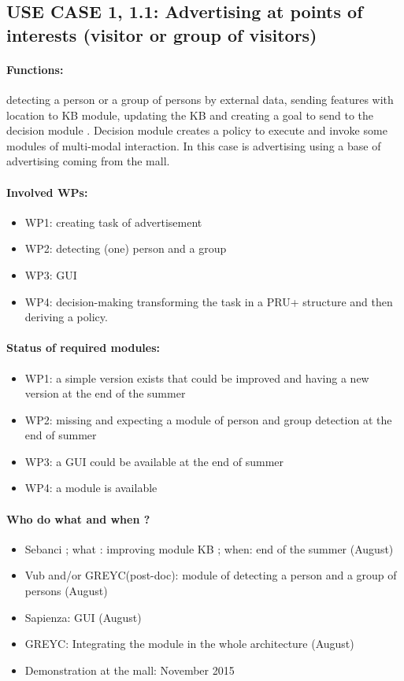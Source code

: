 \documentclass{article}
\begin{document}
\subsection{USE CASE 1, 1.1:  Advertising at points of interests (visitor or group of visitors)}
\paragraph{\bf Functions:} detecting a person or a group of persons by external data, sending features with location to KB module, updating the KB  and creating a goal to send to the decision module . Decision module creates a policy to execute and invoke some modules of  multi-modal interaction. In this case is advertising using a base of advertising coming from the mall. \\
\paragraph{Involved WPs:}
\begin{itemize}
\item WP1:  creating task of advertisement
\item WP2: detecting (one) person and a group 
\item WP3: GUI
\item WP4: decision-making transforming the task in a PRU+ structure and then deriving a policy. 
\end{itemize}
\paragraph{\bf Status of required modules:}
\begin{itemize}
\item WP1: a simple version exists that could be improved and having a new version at the end of the summer
\item WP2: missing and expecting a module of person and group detection at the end of summer
\item WP3: a GUI could be available at the end of summer
\item WP4: a module is available
\end{itemize}
\paragraph{Who do what and when ?}
\begin{itemize} 
\item Sebanci ; what : improving module KB ; when: end of the summer (August)
\item Vub and/or GREYC(post-doc): module of detecting a person and a group of persons (August)
\item Sapienza: GUI (August)
\item GREYC: Integrating the module in the whole architecture (August)
\item Demonstration at the mall: November 2015
\end{itemize}
\end{document}
